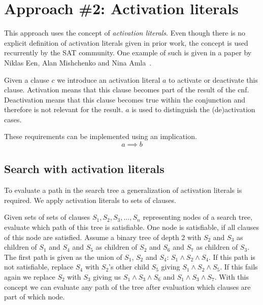 \newpage
\section{Approach \#2: Activation literals}
\label{sec:encoding:activation-literals}
%
This approach uses the concept of \emph{activation literals}. Even though there is no explicit definition of activation literals given in prior work, the concept is used recurrently by the SAT community. One example of such is given in a paper by Niklas Een, Alan Mishchenko and Nina Amla~\cite{Sat30}.

Given a clause $c$ we introduce an activation literal $a$ to activate or deactivate this clause. Activation means that this clause becomes part of the result of the \gls{cnf}. Deactivation means that this
clause becomes true within the conjunction and therefore is not relevant for the result. $a$ is used to distinguish the (de)activation cases.

These requirements can be implemented using an implication.
\[
  a \implies b
\]

\subsection{Search with activation literals}
\label{sec:activation-literals-search}
%
To evaluate a path in the search tree a generalization of activation literals is required. We apply activation literals to sets of clauses.

Given sets of sets of clauses $S_1, S_2, S_3, \ldots, S_n$ representing nodes of a search tree, evaluate which path of this tree is satisfiable. One node is satisfiable, if all clauses of this node are satisfied. Assume a binary tree of depth 2 with $S_2$ and $S_3$ as children of $S_1$ and $S_4$ and $S_5$ as children of $S_2$ and $S_6$ and $S_7$ as children of $S_3$. The first path is given as the union of $S_1$, $S_2$ and $S_4$: $S_1 \land S_2 \land S_4$. If this path is not satisfiable, replace $S_4$ with $S_2$'s other child $S_5$ giving $S_1 \land S_2 \land S_5$. If this fails again we replace $S_2$ with $S_3$ giving us $S_1 \land S_3 \land S_6$ and $S_1 \land S_3 \land S_7$. With this concept we can evaluate any path of the tree after evaluation which clauses are part of which node.

